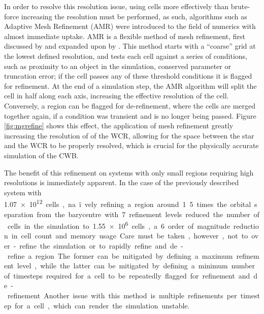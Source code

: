 In order to resolve this resolution issue, using cells more effectively than brute-force increasing the resolution must be performed, as such, algorithms such as Adaptive Mesh Refinement (AMR) were introduced to the field of numerics with almost immediate uptake.
AMR is a flexible method of mesh refinement, first discussed by \textcite{bergerAdaptiveMeshRefinement1984} and expanded upon by \textcite{bergerLocalAdaptiveMesh1989}.
This method starts with a ``coarse'' grid at the lowest defined resolution, and tests each cell against a series of conditions, such as proximity to an object in the simulation, conserved parameter or truncation error; if the cell passes any of these threshold conditions it is flagged for refinement.
At the end of a simulation step, the AMR algorithm will split the cell in half along each axis, increasing the effective resolution of the cell.
Conversely, a region can be flagged for de-refinement, where the cells are merged together again, if a condition was transient and is no longer being passed.
Figure \ref{fig:mgrefine} shows this effect, the application of mesh refinement greatly increasing the resolution of of the WCR, allowing for the space between the star and the WCR to be properly resolved, which is crucial for the physically accurate simulation of the CWB.

The benefit of this refinement on systems with only small regions requiring high resolutions is immediately apparent.
In the case of the previously described system with \SI{1.07e12} cells, na\"ively refining a region around 1.5 times the orbital separation from the barycentre with 7 refinement levels reduced the number of cells in the simulation to \num{1.55e6} cells, a 6 order of magnitude reduction in cell count and memory usage.
Care must be taken, however, not to over-refine the simulation or to rapidly refine and de-refine a region.
The former can be mitigated by defining a maximum refinement level, while the latter can be mitigated by defining a minimum number of timesteps required for a cell to be repeatedly flagged for refinement and de-refinement.
Another issue with this method is multiple refinements per timestep for a cell, which can render the simulation unstable.

